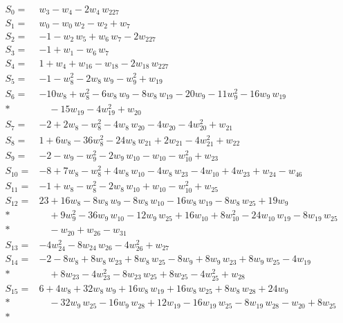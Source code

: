 \begingroup
\small
\setlength{\jot}{3pt}
\allowdisplaybreaks[4]
\begin{align*}
S_{0}={}& w_{3} - w_{4} - 2w_{4}\,w_{227} \\[2pt]
S_{1}={}& w_{0} - w_{0}\,w_{2} - w_{2} + w_{7} \\[2pt]
S_{2}={}& -1 - w_{2}\,w_{5} + w_{6}\,w_{7} - 2w_{227} \\[2pt]
S_{3}={}& -1 + w_{1} - w_{6}\,w_{7} \\[2pt]
S_{4}={}& 1 + w_{4} + w_{16} - w_{18} - 2w_{18}\,w_{227} \\[2pt]
S_{5}={}& -1 - w_{8}^{2} - 2w_{8}\,w_{9} - w_{9}^{2} + w_{19} \\[2pt]
S_{6}={}& -10w_{8} + w_{8}^{2} - 6w_{8}\,w_{9} - 8w_{8}\,w_{19} - 20w_{9} - 11w_{9}^{2} - 16w_{9}\,w_{19} \\*
&\quad  - 15w_{19} - 4w_{19}^{2} + w_{20} \\[2pt]
S_{7}={}& -2 + 2w_{8} - w_{8}^{2} - 4w_{8}\,w_{20} - 4w_{20} - 4w_{20}^{2} + w_{21} \\[2pt]
S_{8}={}& 1 + 6w_{8} - 36w_{8}^{2} - 24w_{8}\,w_{21} + 2w_{21} - 4w_{21}^{2} + w_{22} \\[2pt]
S_{9}={}& -2 - w_{9} - w_{9}^{2} - 2w_{9}\,w_{10} - w_{10} - w_{10}^{2} + w_{23} \\[2pt]
S_{10}={}& -8 + 7w_{8} - w_{8}^{2} + 4w_{8}\,w_{10} - 4w_{8}\,w_{23} - 4w_{10} + 4w_{23} + w_{24} - w_{46} \\[2pt]
S_{11}={}& -1 + w_{8} - w_{8}^{2} - 2w_{8}\,w_{10} + w_{10} - w_{10}^{2} + w_{25} \\[2pt]
S_{12}={}& 23 + 16w_{8} - 8w_{8}\,w_{9} - 8w_{8}\,w_{10} - 16w_{8}\,w_{19} - 8w_{8}\,w_{25} + 19w_{9} \\*
&\quad  + 9w_{9}^{2} - 36w_{9}\,w_{10} - 12w_{9}\,w_{25} + 16w_{10} + 8w_{10}^{2} - 24w_{10}\,w_{19} - 8w_{19}\,w_{25} \\*
&\quad  - w_{20} + w_{26} - w_{31} \\[2pt]
S_{13}={}& -4w_{24}^{2} - 8w_{24}\,w_{26} - 4w_{26}^{2} + w_{27} \\[2pt]
S_{14}={}& -2 - 8w_{8} + 8w_{8}\,w_{23} + 8w_{8}\,w_{25} - 8w_{9} + 8w_{9}\,w_{23} + 8w_{9}\,w_{25} - 4w_{19} \\*
&\quad  + 8w_{23} - 4w_{23}^{2} - 8w_{23}\,w_{25} + 8w_{25} - 4w_{25}^{2} + w_{28} \\[2pt]
S_{15}={}& 6 + 4w_{8} + 32w_{8}\,w_{9} + 16w_{8}\,w_{19} + 16w_{8}\,w_{25} + 8w_{8}\,w_{28} + 24w_{9} \\*
&\quad  - 32w_{9}\,w_{25} - 16w_{9}\,w_{28} + 12w_{19} - 16w_{19}\,w_{25} - 8w_{19}\,w_{28} - w_{20} + 8w_{25} \\*

\end{align*}

